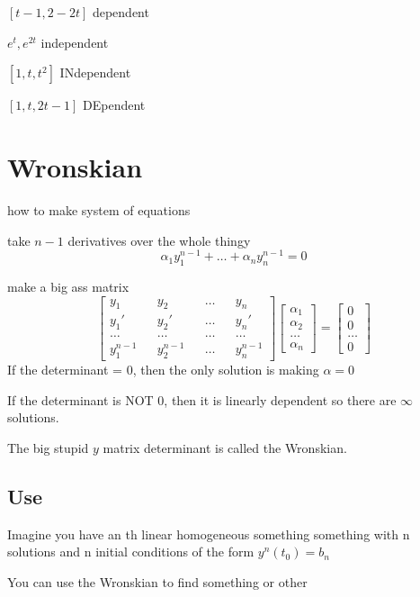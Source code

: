 \documentclass[fleqn]{report}
\begin{document}
$[t-1, 2 - 2t]$ dependent

$e^t, e^{2t}$ independent

$[1, t, t^2]$ INdependent

$[1, t, 2t - 1]$ DEpendent


\section{Wronskian}
how to make system of equations

take $n-1$ derivatives over the whole thingy
\[
\alpha_1 y_1^{n - 1} + \ldots + \alpha_n y_n^{n - 1} = 0 
\]

make a big ass matrix
\[
\begin{bmatrix}
y_1 && y_2 && \ldots && y_n \\
y_1' && y_2' && \ldots && y_n' \\
\ldots && \ldots && \ldots && \ldots \\
y_1^{n-1} && y_2^{n-1} && \ldots && y_n^{n-1} 
\end{bmatrix}
%
\begin{bmatrix}
\alpha_1 \\ \alpha_2 \\ \ldots \\ \alpha_n
\end{bmatrix}
=
\begin{bmatrix}
0 \\ 0 \\ \ldots \\ 0
\end{bmatrix}
\]
If the determinant = 0, then the only solution is making $\alpha = 0$

If the determinant is NOT 0, then it is linearly dependent so there are $\infty$ solutions.

The big stupid $y$ matrix determinant is called the Wronskian.

\subsection{Use}
Imagine you have an th linear homogeneous something something with n solutions and n initial conditions of the form $y^n(t_0) = b_n$

You can use the Wronskian to find something or other
\end{document}
